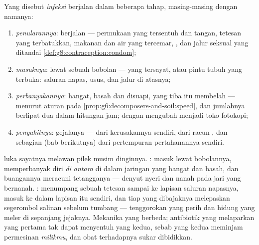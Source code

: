 \begin{definition}\label{def:g9:microbes-and-infection:stages}
Yang disebut \emph{infeksi} berjalan dalam
beberapa tahap, masing-masing dengan namanya:
\begin{enumerate}
  \item \emph{penularannya}:  berjalan ---
        permukaan yang tersentuh dan tangan, tetesan yang
        terbatukkan, makanan dan air yang tercemar, ,
        dan jalur seksual yang ditandai
        \cref{def:g8:contraception:condom};
  \item \emph{masuknya}: lewat sebuah bobolan ---  yang
        tersayat, atau pintu tubuh yang terbuka: saluran
        napas, usus, dan jalur di atasnya;
  \item \emph{perbanyakannya}: hangat, basah dan disuapi,
        yang tiba itu membelah ---  menurut aturan
         pada \cref{prop:g6:decomposers-and-soil:speed},
        dan jumlahnya berlipat dua dalam hitungan jam;
         dengan mengubah  menjadi toko fotokopi;
  \item \emph{penyakitnya}: gejalanya --- dari kerusakannya
        sendiri, dari racun , dan sebagian (bab
        berikutnya) dari pertempuran pertahanannya sendiri.
\end{enumerate}
\end{definition}

\begin{example}\label{ex:g9:microbes-and-infection:contrast}
 luka sayatnya melawan  pilek musim dinginnya.
: masuk lewat bobolannya, memperbanyak diri
\emph{di antara}  di dalam jaringan yang hangat dan
basah, dan buangannya meracuni tetangganya --- denyut nyeri
dan nanah pada jari yang bernanah. : menumpang
sebuah tetesan sampai ke lapisan saluran napasnya, masuk ke
dalam  lapisan itu sendiri, dan tiap  yang dibajaknya
melepaskan segerombol salinan sebelum tumbang --- tenggorokan
yang perih dan hidung yang meler di sepanjang jejaknya.
Mekanika yang berbeda; antibiotik yang melaparkan yang
pertama tak dapat menyentuh yang kedua, sebab yang kedua
meminjam permesinan \emph{milikmu}, dan obat terhadapnya
sukar dibidikkan.
\end{example}

